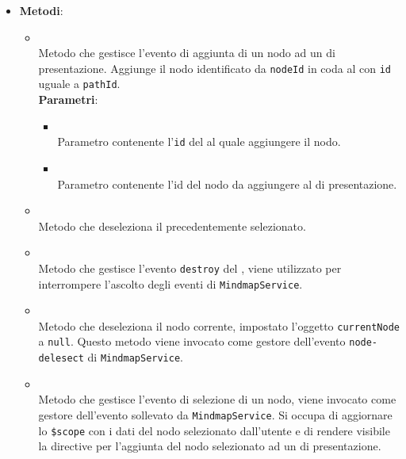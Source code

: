 \begin{itemize}
\begin{itemize}
\\ \dpMDDialogServiceField
\item {}
\\ \dpScopeField
\end{itemize}
\item \textbf{Metodi}:
\begin{itemize}
\item {}
\\ Metodo che gestisce l'evento di aggiunta di un nodo ad un  di presentazione. Aggiunge il nodo identificato da \texttt{nodeId} in coda al  con \texttt{id} uguale a \texttt{pathId}.
\\ \textbf{Parametri}:
\begin{itemize}
\item {}
\\ Parametro contenente l'\texttt{id} del  al quale aggiungere il nodo.
\item {}
\\ Parametro contenente l'id del nodo da aggiungere al  di presentazione.
\end{itemize}
\item {}
\\ Metodo che deseleziona il  precedentemente selezionato.
\item {}
\\ Metodo che gestisce l'evento \texttt{destroy} del , viene utilizzato per interrompere l'ascolto degli eventi di \texttt{MindmapService}.
\item {}
\\ Metodo che deseleziona il nodo corrente, impostato l'oggetto \texttt{currentNode} a \texttt{null}. Questo metodo viene invocato come gestore dell'evento \texttt{node-delesect} di \texttt{MindmapService}.
\item {}
\\ Metodo che gestisce l'evento di selezione di un nodo, viene invocato come gestore dell'evento sollevato da \texttt{MindmapService}. Si occupa di aggiornare lo \texttt{\$scope} con i dati del nodo selezionato dall'utente e di rendere visibile la directive per l'aggiunta del nodo selezionato ad un  di presentazione.

\end{itemize}
\end{itemize}
